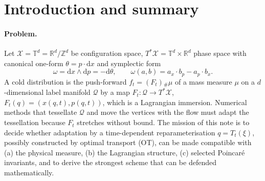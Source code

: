\documentclass[11pt,a4paper]{article}
\numberwithin{equation}{section}
\theoremstyle{definition}
\theoremstyle{remark}
\newcommand{\R}{\mathbb{R}}
\newcommand{\T}{\mathbb{T}}
\newcommand{\Z}{\mathbb{Z}}
\newcommand{\X}{\mathcal{X}}
\newcommand{\Q}{\mathcal{Q}}
\newcommand{\dd}{\mathrm{d}}
\newcommand{\pf}{{}_{\#}}
\newcommand{\om}{\omega}
\begin{document}
\begin{abstract}
A reference prototype with external Hamiltonians confirms the statements: in two-dimensional phase space the
action-corrected remap keeps the Poincar\'e invariant at round-off over 1--399 remaps while interpolation
remaps drift, and in chaotic and collapse tests it retains normal accuracy $10^{-6}$ where a fixed Lagrangian
mesh of the same size has $O(1)$ error; in four-dimensional phase space (single-stream regime) the
generating-function element gives circulation at quadrature round-off after Monge--Amp\`ere remaps. What is
\emph{not} established is a globally conforming exactly Lagrangian discrete carrier across caustics in $d\ge2$,
and any stability result for the self-consistent Vlasov--Poisson coupling. Individual ingredients have clear
antecedents (ColDICE, CIP schemes, wavefront construction, Monge--Amp\`ere mesh adaptation); the contribution
defended here is the structural analysis and the action-based remap, not the combination as such.
\end{abstract}

\tableofcontents

\section{Introduction and summary}\label{sec:intro}

\paragraph{Problem.} Let $\X=\T^d=\R^d/\Z^d$ be configuration space, $T^*\X=\T^d\times\R^d$ phase space with
canonical one-form $\theta=p\cdot\dd x$ and symplectic form
\begin{equation}\label{eq:omega}
\om=\dd x\wedge \dd p=-\dd\theta,\qquad \om(a,b)=a_x\cdot b_p-a_p\cdot b_x .
\end{equation}
A cold distribution is the push-forward $f_t=(F_t)\pf\mu$ of a mass measure $\mu$ on a $d$-dimensional label
manifold $\Q$ by a map $F_t:\Q\to T^*\X$, $F_t(q)=(x(q,t),p(q,t))$, which is a Lagrangian immersion. Numerical
methods that tessellate $\Q$ and move the vertices with the flow
\cite{AbelHahnKaehler2012,ShandarinHabibHeitmann2012,HahnAbelKaehler2013,HahnAngulo2016,SousbieColombi2016}
must adapt the tessellation because $F_t$ stretches without bound. The mission of this note is to decide whether
adaptation by a time-dependent reparameterisation $q=T_t(\xi)$, possibly constructed by optimal transport (OT),
can be made compatible with (a) the physical measure, (b) the Lagrangian structure, (c) selected
Poincar\'e invariants, and to derive the strongest scheme that can be defended mathematically.
\end{document}
